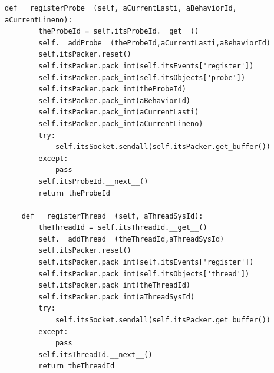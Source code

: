 \documentclass[12pt,legalpaper]{report}
\begin{document}
\begin{singlespace}
\begin{lstlisting}[style=Python]
    def __registerProbe__(self, aCurrentLasti, aBehaviorId, aCurrentLineno):
        theProbeId = self.itsProbeId.__get__()
        self.__addProbe__(theProbeId,aCurrentLasti,aBehaviorId)
        self.itsPacker.reset()
        self.itsPacker.pack_int(self.itsEvents['register'])
        self.itsPacker.pack_int(self.itsObjects['probe'])
        self.itsPacker.pack_int(theProbeId)
        self.itsPacker.pack_int(aBehaviorId)
        self.itsPacker.pack_int(aCurrentLasti)
        self.itsPacker.pack_int(aCurrentLineno)
        try:
            self.itsSocket.sendall(self.itsPacker.get_buffer())
        except:
            pass
        self.itsProbeId.__next__()
        return theProbeId
    
    def __registerThread__(self, aThreadSysId):
        theThreadId = self.itsThreadId.__get__()
        self.__addThread__(theThreadId,aThreadSysId)
        self.itsPacker.reset()
        self.itsPacker.pack_int(self.itsEvents['register'])
        self.itsPacker.pack_int(self.itsObjects['thread'])
        self.itsPacker.pack_int(theThreadId)
        self.itsPacker.pack_int(aThreadSysId)
        try:
            self.itsSocket.sendall(self.itsPacker.get_buffer())
        except:
            pass
        self.itsThreadId.__next__()
        return theThreadId


\end{lstlisting}
\end{singlespace}
\end{document}
